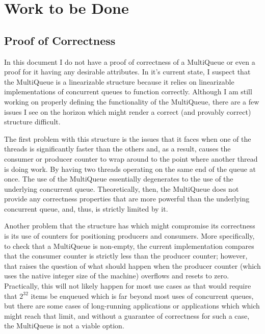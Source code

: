 \documentclass[12pt]{report}
\begin{document}
\begin{scriptsize}
\begin{algorithm}[H]
{}
\end{algorithm}
\end{scriptsize}

\section{Work to be Done}
\subsection{Proof of Correctness}
In this document I do not have a proof of correctness of a MultiQueue or even a
proof for it having any desirable attributes. In it's current state, I suspect
that the MultiQueue is a linearizable structure because it relies on
linearizable implementations of concurrent queues to function correctly.
Although I am still working on properly defining the functionality of the
MultiQueue, there are a few issues I see on the horizon which might render a
correct (and provably correct) structure difficult.

The first problem with this structure is the issues that it faces when one of
the threads is significantly faster than the others and, as a result, causes
the consumer or producer counter to wrap around to the point where another
thread is doing work. By having two threads operating on the same end of the
queue at once. The use of the MultiQueue essentially degenerates to the use of
the underlying concurrent queue. Theoretically, then, the MultiQueue does not
provide any correctness properties that are more powerful than the underlying
concurrent queue, and, thus, is strictly limited by it.

Another problem that the structure has which might compromise its correctness
is its use of counters for positioning producers and consumers. More
specifically, to check that a MultiQueue is non-empty, the current
implementation compares that the consumer counter is strictly less than the
producer counter; however, that raises the question of what should happen when
the producer counter (which uses the native integer size of the machine)
overflows and resets to zero. Practically, this will not likely happen for most
use cases as that would require that $2^{32}$ items be enqueued which is far
beyond most uses of concurrent queues, but there are some cases of long-running
applications or applications which which might reach that limit, and without a
guarantee of correctness for such a case, the MultiQueue is not a viable
option.
\end{document}
